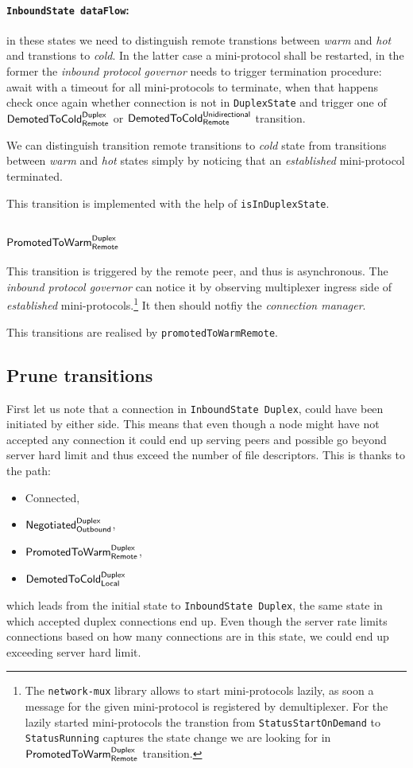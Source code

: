 \documentclass{article}
\def\InitialState{\textbullet}
\def\DuplexState{\texttt{DuplexState}}
\def\InboundStateDup{\texttt{InboundState Duplex}}
\def\InboundStateAny{\texttt{InboundState dataFlow}}
\def\Connected{\textsf{Connected}}
\def\NegotiatedDupOut{$\text{\textsf{Negotiated}}^\text{\textsf{Duplex}}_\text{\textsf{Outbound}}$}
\def\PromotedToWarmDupRem{$\text{\textsf{PromotedToWarm}}^\text{\textsf{Duplex}}_\text{\textsf{Remote}}$}
\def\DemotedToColdDupLoc{$\text{\textsf{DemotedToCold}}^\text{\textsf{Duplex}}_\text{\textsf{Local}}$}
\def\DemotedToColdDupRem{$\text{\textsf{DemotedToCold}}^\text{\textsf{Duplex}}_\text{\textsf{Remote}}$}
\def\DemotedToColdUniRem{$\text{\textsf{DemotedToCold}}^\text{\textsf{Unidirectional}}_\text{\textsf{Remote}}$}
\def\Prune{\textsf{Prune}}
\def\cold{\textit{cold}}
\def\warm{\textit{warm}}
\def\hot{\textit{hot}}
\def\established{\textit{established}}
\def\inbgov{\textit{inbound protocol governor}}
\def\connmngr{\textit{connection manager}}
\begin{document}
\paragraph{\InboundStateAny{}:}
in these states we need to distinguish remote transtions between \warm{} and
\hot{} and transtions to \cold{}.  In the latter case a mini-protocol shall be
restarted, in the former the \inbgov{} needs to trigger termination procedure:
await with a timeout for all mini-protocols to terminate, when that happens
check once again whether connection is not in \DuplexState{} and trigger one of
\DemotedToColdDupRem{} or \DemotedToColdUniRem{} transition.

We can distinguish transition remote transitions to \cold{} state from
transitions between \warm{} and \hot{} states simply by noticing that an
\established{} mini-protocol terminated.

This transition is implemented with the help of \texttt{isInDuplexState}.

\subsection{\PromotedToWarmDupRem{}}
This transition is triggered by the remote peer, and thus is asynchronous.  The
\inbgov{} can notice it by observing multiplexer ingress side of \established{}
mini-protocols.\footnote{The \texttt{network-mux} library allows to start
mini-protocols lazily, as soon a message for the given mini-protocol is
registered by demultiplexer. For the lazily started mini-protocols the
transtion from \texttt{StatusStartOnDemand} to \texttt{StatusRunning} captures
the state change we are looking for in \PromotedToWarmDupRem{} transition.}
It then should notfiy the \connmngr{}.

This transitions are realised by \texttt{promotedToWarmRemote}.

\subsection{\Prune{} transitions}
First let us note that a connection in \InboundStateDup{}, could have been
initiated by either side.  This means that even though a node might have not
accepted any connection it could end up serving peers and possible go beyond
server hard limit and thus exceed the number of file descriptors.  This is
thanks to the path:
\begin{itemize}
  \item[] \Connected{},
  \item[] \NegotiatedDupOut{},
  \item[] \PromotedToWarmDupRem{},
  \item[] \DemotedToColdDupLoc{}
\end{itemize}
which leads from the initial state \InitialState{} to \InboundStateDup{}, the
same state in which accepted duplex connections end up.  Even though the server
rate limits connections based on how many connections are in this state, we
could end up exceeding server hard limit.
\end{document}
